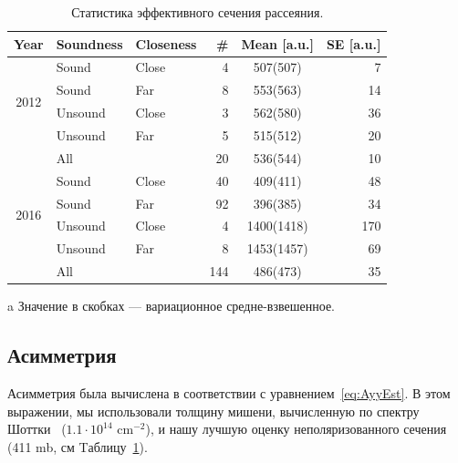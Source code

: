 \documentclass{article}
\begin{document}
	\begin{table}
		\centering
		\begin{threeparttable}
			\caption{Статистика эффективного сечения рассеяния. \label{tbl:CS-all}}
			\begin{tabular}{c|llrcr}
				\hline\hline
				Year						& Soundness		& Closeness		& \#		& Mean\tnote{a} [a.u.]	& SE [a.u.] \\
				\hline
				\multirow{4}{*}{2012}		& Sound			& Close			& 4			& 507(507)				& 7  \\
				& Sound			& Far			& 8			& 553(563)				& 14 \\
				& Unsound		& Close			& 3			& 562(580)				& 36 \\
				& Unsound		& Far			& 5			& 515(512)				& 20 \\
				& All			& 				& 20		& 536(544)				& 10 \\
				\hline					
				\multirow{4}{*}{2016}		& Sound			& Close			& 40		& 409(411)				& 48 \\
				& Sound			& Far			& 92		& 396(385)				& 34 \\
				& Unsound		& Close			& 4			& 1400(1418)			& 170\\
				& Unsound		& Far			& 8			& 1453(1457)			& 69 \\
				& All			& 				& 144		& 486(473)				& 35 \\
				\hline\hline
			\end{tabular}
			\begin{tablenotes}
				\item[a] Значение в скобках --- вариационное средне-взвешенное.
			\end{tablenotes}
		\end{threeparttable}
	\end{table}	

	\subsection{Асимметрия}\label{sec:Asymmetry}	
	Асимметрия была вычислена в соответствии с уравнением~\eqref{eq:AyyEst}. В этом выражении, мы использовали толщину мишени, вычисленную по спектру Шоттки~\cite{Stein} ($1.1\cdot 10^{14}$ cm$^{-2}$), и нашу лучшую оценку неполяризованного сечения (411 mb, см Tаблицу~\ref{tbl:CS-all}).
	
\end{document}
